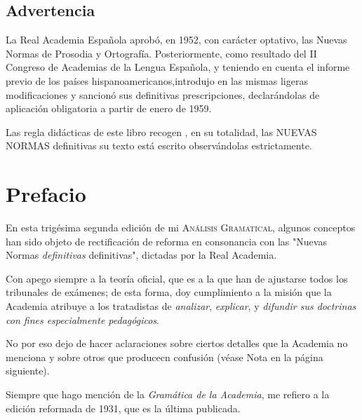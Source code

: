\section*{Advertencia}

La Real Academia Española aprobó, en 1952, con carácter optativo, las Nuevas Normas de Prosodia y Ortografía. Posteriormente, como resultado del II Congreso de Academias de la Lengua Española, y teniendo en cuenta el informe previo de los países hispanoamericanos,introdujo en las mismas ligeras modificaciones y sancionó sus definitivas prescripciones, declarándolas de aplicación obligatoria a partir de enero de 1959.

\par Las regla didácticas de este libro recogen , en su totalidad, las NUEVAS NORMAS definitivas su texto está escrito observándolas estrictamente.

\chapter*{Prefacio}
En esta trigésima segunda edición de mi \textsc{Análisis Gramatical}, algunos conceptos han sido objeto de rectificación de reforma en consonancia con las "Nuevas Normas \textit{definitivas} definitivas", dictadas por la Real Academia.

\par Con apego siempre a la teoría oficial, que es a la que han de ajustarse todos los tribunales de exámenes;  de esta forma, doy cumplimiento a la misión que la Academia atribuye a los tratadistas de \textit{analizar}, \textit{explicar}, y \textit{difundir sus doctrinas con fines especialmente pedagógicos}.

\par No por eso dejo de hacer aclaraciones sobre ciertos detalles que la Academia no menciona y sobre otros que producecn confusión (véase Nota en la página siguiente).

\par Siempre que hago mención de la \textit{Gramática de la Academia}, me refiero a la edición reformada de 1931, que es la última publicada.
